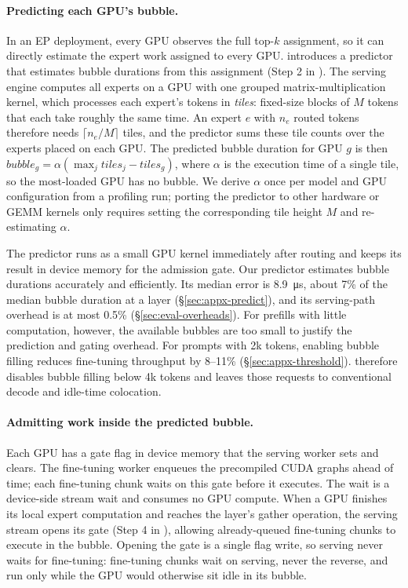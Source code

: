 \paragraph{Predicting each GPU's bubble.}
\label{sec:design-predict}
In an \ac{EP} deployment, every GPU observes the full top-$k$ assignment, so it can directly estimate the expert work assigned to every GPU.
\sys introduces a predictor that estimates bubble durations from this assignment (Step 2 in ).
The serving engine computes all experts on a GPU with one grouped matrix-multiplication kernel, which processes each expert's tokens in \emph{tiles}: fixed-size blocks of $M$ tokens that each take roughly the same time.
An expert $e$ with $n_e$ routed tokens therefore needs $\lceil n_e/M\rceil$ tiles, and the predictor sums these tile counts over the experts placed on each GPU.
The predicted bubble duration for GPU $g$ is then $\mathit{bubble}_g = \alpha(\max_j \mathit{tiles}_j - \mathit{tiles}_g)$, where $\alpha$ is the execution time of a single tile, so the most-loaded GPU has no bubble.
We derive $\alpha$ once per model and GPU configuration from a profiling run; porting the predictor to other hardware or \ac{GEMM} kernels only requires setting the corresponding tile height $M$ and re-estimating $\alpha$.

The predictor runs as a small GPU kernel immediately after routing and keeps its result in device memory for the admission gate.
Our predictor estimates bubble durations accurately and efficiently.
Its median error is \SI{8.9}{\micro\second}, about 7\% of the median bubble duration at a layer (\S\ref{sec:appx-predict}), and its serving-path overhead is at most 0.5\% (\S\ref{sec:eval-overheads}).
For prefills with little computation, however, the available bubbles are too small to justify the prediction and gating overhead.
For prompts with 2k tokens, enabling bubble filling reduces fine-tuning throughput by 8--11\% (\S\ref{sec:appx-threshold}).
\sys{} therefore disables bubble filling below 4k tokens and leaves those requests to conventional decode and idle-time colocation.

\paragraph{Admitting work inside the predicted bubble.}
Each GPU has a gate flag in device memory that the serving worker sets and clears.
The fine-tuning worker enqueues the precompiled CUDA graphs ahead of time; each fine-tuning chunk waits on this gate before it executes.
The wait is a device-side stream wait and consumes no GPU compute.
When a GPU finishes its local expert computation and reaches the layer's gather operation, the serving stream opens its gate (Step 4 in ), allowing already-queued fine-tuning chunks to execute in the bubble.
Opening the gate is a single flag write, so serving never waits for fine-tuning: fine-tuning chunks wait on serving, never the reverse, and run only while the GPU would otherwise sit idle in its bubble.

